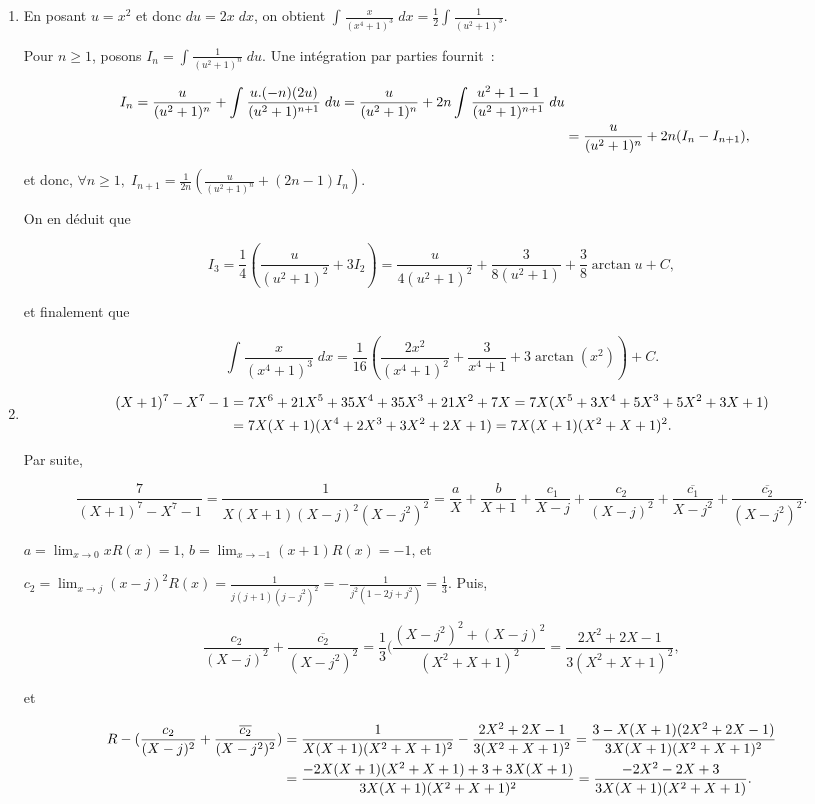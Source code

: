 \documentclass[11pt,a4paper]{article}
\newcommand{\Arctan}{\mathop{\mathrm{arctan}}\nolimits}
\begin{document}
\begin{enumerate}
\item  En posant $u=x^2$ et donc $du=2x\;dx$, on obtient $\int_{}^{}\frac{x}{(x^4+1)^3}\;dx=\frac{1}{2}\int_{}^{}\frac{1}{(u^2+1)^3}$.

Pour $n\geq1$, posons $I_n=\int_{}^{}\frac{1}{(u^2+1)^n}\;du$. Une intégration par parties fournit~:

\begin{align*}\ensuremath
I_n=\frac{u}{(u^2+1)^n}+\int_{}^{}\frac{u.(-n)(2u)}{(u^2+1)^{n+1}}\;du=\frac{u}{(u^2+1)^n}+2n\int_{}^{}\frac{u^2+1-1}{(u^2+1)^{n+1}}\;du\\
 &=\frac{u}{(u^2+1)^n}+2n(I_n-I_{n+1}),
\end{align*}

et donc, $\forall n\geq1,\;I_{n+1}=\frac{1}{2n}(\frac{u}{(u^2+1)^n}+(2n-1)I_n)$.

On en déduit que

$$I_3=\frac{1}{4}(\frac{u}{(u^2+1)^2}+3I_2)=\frac{u}{4(u^2+1)^2}+\frac{3}{8(u^2+1)}+\frac{3}{8}\Arctan u+C,$$

et finalement que

$$\int_{}^{}\frac{x}{(x^4+1)^3}\;dx=\frac{1}{16}(\frac{2x^2}{(x^4+1)^2}+\frac{3}{x^4+1}+3\Arctan(x^2))+C.$$

\item  
\begin{align*}\ensuremath
(X+1)^7-X^7-1&=7X^6+21X^5+35X^4+35X^3+21X^2+7X=7X(X^5+3X^4+5X^3+5X^2+3X+1)\\
 &=7X(X+1)(X^4+2X^3+3X^2+2X+1)=7X(X+1)(X^2+X+1)^2.
\end{align*}

Par suite,

$$\frac{7}{(X+1)^7-X^7-1}=\frac{1}{X(X+1)(X-j)^2(X-j^2)^2}=\frac{a}{X}+\frac{b}{X+1}+\frac{c_1}{X-j}
+\frac{c_2}{(X-j)^2}+\frac{\overline{c_1}}{X-j^2}+\frac{\overline{c_2}}{(X-j^2)^2}.$$

$a=\lim_{x\rightarrow 0}xR(x)=1$, $b=\lim_{x\rightarrow -1}(x+1)R(x)=-1$, et

$c_2=\lim_{x\rightarrow j}(x-j)^2R(x)=\frac{1}{j(j+1)(j-j^2)^2}=-\frac{1}{j^2(1-2j+j^2)}=\frac{1}{3}$. Puis, 

$$\frac{c_2}{(X-j)^2}+\frac{\overline{c_2}}{(X-j^2)^2}=\frac{1}{3}(\frac{(X-j^2)^2+(X-j)^2}{(X^2+X+1)^2}
=\frac{2X^2+2X-1}{3(X^2+X+1)^2},$$

et

\begin{align*}\ensuremath
R-(\frac{c_2}{(X-j)^2}+\frac{\overline{c_2}}{(X-j^2)^2})
&=\frac{1}{X(X+1)(X^2+X+1)^2}-\frac{2X^2+2X-1}{3(X^2+X+1)^2}
=\frac{3-X(X+1)(2X^2+2X-1)}{3X(X+1)(X^2+X+1)^2}\\
 &=\frac{-2X(X+1)(X^2+X+1)+3+3X(X+1)}{3X(X+1)(X^2+X+1)^2}
=\frac{-2X^2-2X+3}{3X(X+1)(X^2+X+1)}.
\end{align*}


\end{enumerate}
\end{document}
